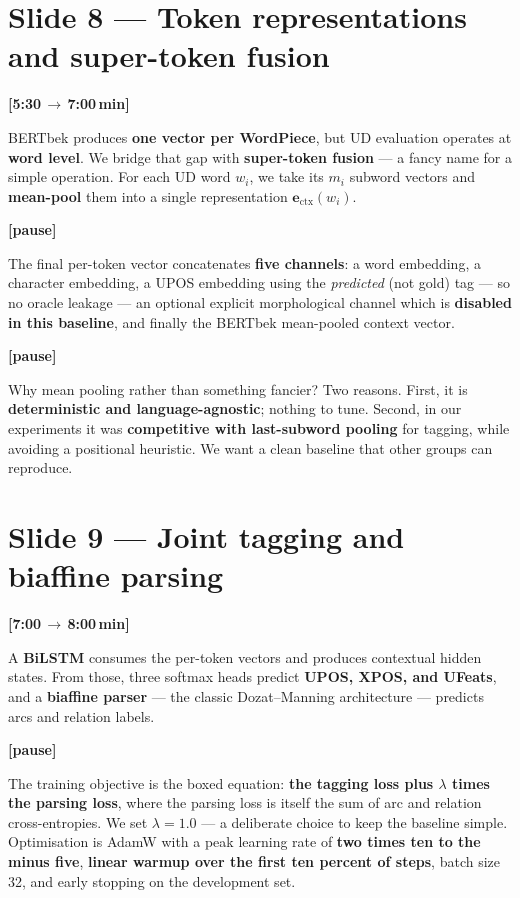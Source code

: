 \documentclass[12pt,a4paper]{article}
\newcommand{\timing}[2]{%
   \par\noindent\textbf{\small [#1\,$\to$\,#2\,min]}\par\vspace{0.2em}}
\newcommand{\say}[1]{\textbf{#1}}
\newcommand{\pause}{\par\vspace{0.4em}\textbf{[pause]}\par}
\begin{document}
\section*{Slide 8 --- Token representations and super-token fusion}
\timing{5:30}{7:00}

BERTbek produces \textbf{one vector per WordPiece}, but UD evaluation
operates at \textbf{word level}. We bridge that gap with \say{super-token
fusion} --- a fancy name for a simple operation. For each UD word $w_i$,
we take its $m_i$ subword vectors and \textbf{mean-pool} them into a
single representation $\mathbf{e}_{\mathrm{ctx}}(w_i)$.

\pause

The final per-token vector concatenates \textbf{five channels}: a word
embedding, a character embedding, a UPOS embedding using the
\emph{predicted} (not gold) tag --- so no oracle leakage --- an optional
explicit morphological channel which is \textbf{disabled in this
baseline}, and finally the BERTbek mean-pooled context vector.

\pause

Why mean pooling rather than something fancier? Two reasons. First, it
is \textbf{deterministic and language-agnostic}; nothing to tune.
Second, in our experiments it was \textbf{competitive with last-subword
pooling} for tagging, while avoiding a positional heuristic. We want a
clean baseline that other groups can reproduce.

\section*{Slide 9 --- Joint tagging and biaffine parsing}
\timing{7:00}{8:00}

A \textbf{BiLSTM} consumes the per-token vectors and produces contextual
hidden states. From those, three softmax heads predict
\textbf{UPOS, XPOS, and UFeats}, and a \textbf{biaffine parser} --- the
classic Dozat--Manning architecture --- predicts arcs and relation labels.

\pause

The training objective is the boxed equation: \say{the tagging loss plus
$\lambda$ times the parsing loss}, where the parsing loss is itself the
sum of arc and relation cross-entropies. We set $\lambda = 1.0$ --- a
deliberate choice to keep the baseline simple. Optimisation is AdamW
with a peak learning rate of \textbf{two times ten to the minus five},
\textbf{linear warmup over the first ten percent of steps}, batch size
32, and early stopping on the development set.
\end{document}
